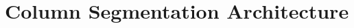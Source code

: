 \documentclass[usenames,dvipsnames]{beamer}
\begin{document}
\begin{frame}
\begin{equation*}
{\begin{array}{l}
\end{array}}
\end{equation*}
\end{frame}


\section{Column Segmentation Architecture}
\end{document}
